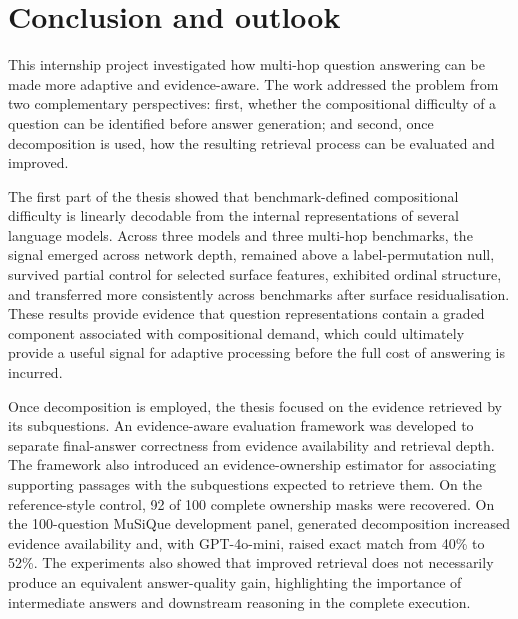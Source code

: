 \chapter*{Conclusion and outlook}
{}
\label{sec:conclusion}

This internship project investigated how multi-hop question answering can be
made more adaptive and evidence-aware. The work addressed the problem from two
complementary perspectives: first, whether the compositional difficulty of a
question can be identified before answer generation; and second, once
decomposition is used, how the resulting retrieval process can be evaluated and
improved.

The first part of the thesis showed that benchmark-defined compositional
difficulty is linearly decodable from the internal representations of several
language models. Across three models and three multi-hop benchmarks, the signal
emerged across network depth, remained above a label-permutation null, survived
partial control for selected surface features, exhibited ordinal structure, and
transferred more consistently across benchmarks after surface residualisation.
These results provide evidence that question representations contain a graded
component associated with compositional demand, which could ultimately provide
a useful signal for adaptive processing before the full cost of answering is
incurred.

Once decomposition is employed, the thesis focused on the evidence retrieved by
its subquestions. An evidence-aware evaluation framework was developed to
separate final-answer correctness from evidence availability and retrieval
depth. The framework also introduced an evidence-ownership estimator for
associating supporting passages with the subquestions expected to retrieve
them. On the reference-style control, 92 of 100 complete ownership masks were
recovered. On the 100-question MuSiQue development panel, generated
decomposition increased evidence availability and, with GPT-4o-mini, raised
exact match from 40\% to 52\%. The experiments also showed that improved
retrieval does not necessarily produce an equivalent answer-quality gain,
highlighting the importance of intermediate answers and downstream reasoning in
the complete execution.

